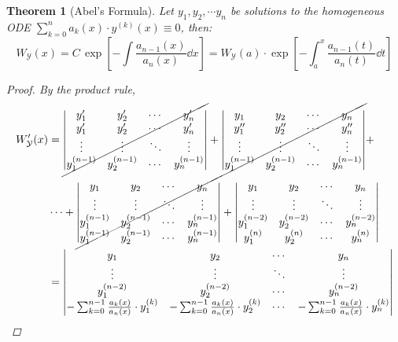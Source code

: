 \documentclass[12pt]{article}
\DeclareMathOperator{\Y}{\mathcal{Y}}
\newcommand{\der}[2][n]{{#2}^{(#1)}}
\newtheorem{theorem}{Theorem}[subsection]
\begin{document}
\begin{theorem}[Abel's Formula]
  Let $y_1,y_2,\cdots y_n$ be solutions to the homogeneous ODE $\sum_{k=0}^n a_k(x)\cdot\der[k]{y}(x)\equiv 0$, then: $$W_{\Y}(x)=C\,\exp\left[-\int \frac{a_{n-1}(x)}{a_n(x)}\dd{x}\right]=W_{\Y}(a)\cdot\exp\left[-\int_a^x \frac{a_{n-1}(t)}{a_n(t)}\dd{t}\right]$$
  \begin{proof}
    By the product rule, 
    \begin{align*}
      W_{\Y}'(x)&=\cancel{\begin{vmatrix}
        y_1'&y_2'&\cdots&y_n'\\
        y_1'&y_2'&\cdots&y_n'\\
        \vdots&\vdots&\ddots&\vdots\\
        \der[n-1]{y}_1&\der[n-1]{y}_2&\cdots&\der[n-1]{y}_n
      \end{vmatrix}}+\cancel{\begin{vmatrix}
        y_1&y_2&\cdots&y_n\\
        y_1''&y_2''&\cdots&y_n''\\
        \vdots&\vdots&\ddots&\vdots\\
        \der[n-1]{y}_1&\der[n-1]{y}_2&\cdots&\der[n-1]{y}_n
      \end{vmatrix}}+\\
      &\cdots+\cancel{\begin{vmatrix}
        y_1&y_2&\cdots&y_n\\
        \vdots&\vdots&\ddots&\vdots\\
        \der[n-1]{y}_1&\der[n-1]{y}_2&\cdots&\der[n-1]{y}_n\\
        \der[n-1]{y}_1&\der[n-1]{y}_2&\cdots&\der[n-1]{y}_n
      \end{vmatrix}}+\begin{vmatrix}
        y_1&y_2&\cdots&y_n\\
        \vdots&\vdots&\ddots&\vdots\\
        \der[n-2]{y}_1&\der[n-2]{y}_2&\cdots&\der[n-2]{y}_n\\
        \der{y}_1&\der{y}_2&\cdots&\der{y}_n
      \end{vmatrix}\\
      &=\begin{vmatrix}
        y_1&y_2&\cdots&y_n\\
        \vdots&\vdots&\ddots&\vdots\\
        \der[n-2]{y}_1&\der[n-2]{y}_2&\cdots&\der[n-2]{y}_n\\
        -\sum_{k=0}^{n-1} \frac{a_k(x)}{a_n(x)}\cdot\der[k]{y}_1&-\sum_{k=0}^{n-1} \frac{a_k(x)}{a_n(x)}\cdot\der[k]{y}_2&\cdots&-\sum_{k=0}^{n-1} \frac{a_k(x)}{a_n(x)}\cdot\der[k]{y}_n

\end{vmatrix}
\end{align*}
\end{proof}
\end{theorem}
\end{document}
